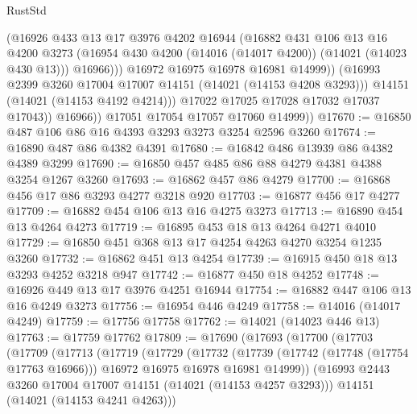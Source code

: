 \begin{lexlean}{RustStd}
\begin{coremodule}
{\begin{coremodule}
{{{{{{{{{{{{{{{{{{{{{{{{{{{{{{{{{{{{{{{                        (@16926
                          @433
                          @13
                          @17
                          @3976
                          @4202
                          @16944
                          (@16882
                            @431
                            @106
                            @13
                            @16
                            @4200
                            @3273
                            (@16954 @430 @4200 (@14016 (@14017 @4200)) (@14021 (@14023 @430 @13)))
                            @16966)))
                      @16972
                      @16975
                      @16978
                      @16981
                      @14999))
                  (@16993 @2399 @3260 @17004 @17007 @14151 (@14021 (@14153 @4208 @3293)))
                  @14151
                  (@14021 (@14153 @4192 @4214)))
                @17022
                @17025
                @17028
                @17032
                @17037
                @17043))
            @16966))
        @17051
        @17054
        @17057
        @17060
        @14999))
@17670 := @16850 @487 @106 @86 @16 @4393 @3293 @3273 @3254 @2596 @3260
@17674 := @16890 @487 @86 @4382 @4391
@17680 := @16842 @486 @13939 @86 @4382 @4389 @3299
@17690 := @16850 @457 @485 @86 @88 @4279 @4381 @4388 @3254 @1267 @3260
@17693 := @16862 @457 @86 @4279
@17700 := @16868 @456 @17 @86 @3293 @4277 @3218 @920
@17703 := @16877 @456 @17 @4277
@17709 := @16882 @454 @106 @13 @16 @4275 @3273
@17713 := @16890 @454 @13 @4264 @4273
@17719 := @16895 @453 @18 @13 @4264 @4271 @4010
@17729 := @16850 @451 @368 @13 @17 @4254 @4263 @4270 @3254 @1235 @3260
@17732 := @16862 @451 @13 @4254
@17739 := @16915 @450 @18 @13 @3293 @4252 @3218 @947
@17742 := @16877 @450 @18 @4252
@17748 := @16926 @449 @13 @17 @3976 @4251 @16944
@17754 := @16882 @447 @106 @13 @16 @4249 @3273
@17756 := @16954 @446 @4249
@17758 := @14016 (@14017 @4249)
@17759 := @17756 @17758
@17762 := @14021 (@14023 @446 @13)
@17763 := @17759 @17762
@17809 := @17690
    (@17693
      (@17700
        (@17703
          (@17709
            (@17713
              (@17719
                (@17729
                  (@17732
                    (@17739
                      (@17742 (@17748 (@17754 @17763 @16966)))
                      @16972
                      @16975
                      @16978
                      @16981
                      @14999))
                  (@16993 @2443 @3260 @17004 @17007 @14151 (@14021 (@14153 @4257 @3293)))
                  @14151
                  (@14021 (@14153 @4241 @4263)))
}}}}}}}}}}}}}}}}}}}}}}}}}}}}}}}}}}}}}}}
\end{coremodule}}
\end{coremodule}
\end{lexlean}

